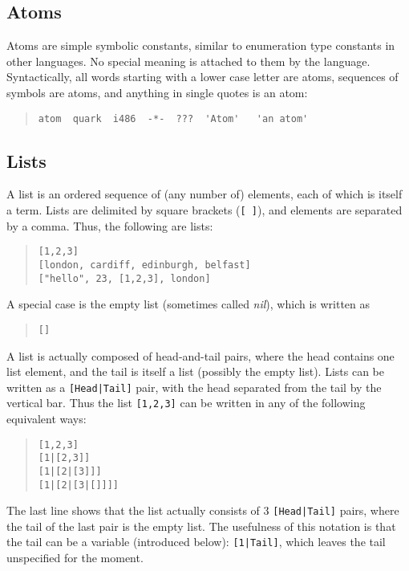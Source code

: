 \subsection{Atoms}

 
Atoms are simple symbolic constants, similar to enumeration type
constants in other languages. No special meaning is attached to them
by the language.  Syntactically, all words starting with a lower case
letter are atoms, sequences of symbols are atoms, and anything in
single quotes is an atom:
\begin{quote}\begin{verbatim}
atom  quark  i486  -*-  ???  'Atom'   'an atom'
\end{verbatim}\end{quote}


\subsection{Lists}

 
A list is an ordered sequence of (any number of) elements, each of
which is itself a term. Lists are delimited by square brackets ({\tt [
]}), and elements are separated by a comma. Thus, the following are
lists:
\begin{quote}\begin{verbatim}
[1,2,3]
[london, cardiff, edinburgh, belfast]
["hello", 23, [1,2,3], london]
\end{verbatim}\end{quote}
 
A special case is the empty list (sometimes called {\em nil}), which
is written as
\begin{quote}\begin{verbatim}
[]
\end{verbatim}\end{quote}
A list is actually composed of head-and-tail pairs, where the head contains one
list element, and the tail is itself a list (possibly the empty list).
Lists can be written as a {\tt [Head|Tail]} pair, with the head separated from
the tail by the vertical bar. Thus the list {\tt [1,2,3]} can
be written in any of the following equivalent ways:
\begin{quote}\begin{verbatim}
[1,2,3]
[1|[2,3]]
[1|[2|[3]]]
[1|[2|[3|[]]]]
\end{verbatim}\end{quote}
The last line shows that the list actually consists of 3 {\tt [Head|Tail]}
pairs, where the tail of the last pair is the empty list.
The usefulness of this notation is
that the tail can be a variable (introduced below):
{\tt [1|Tail]}, which leaves the tail unspecified for the moment. 


